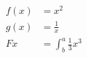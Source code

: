 \documentclass{article}
\begin{document}
	 \begin{align*}
	 f(x) &= x^2\\
	 g(x) &= \frac{1}{x}\\
	 F{x} &= \int^a_b
	 \frac{1}{3}x^3
	 \end{align*}
\end{document}
